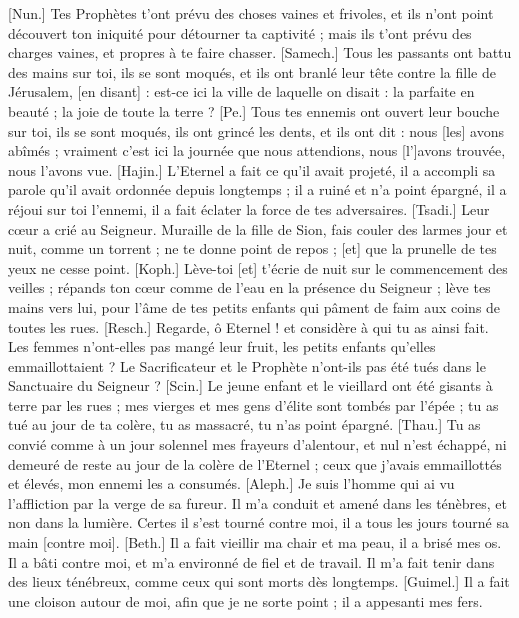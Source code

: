 \begin{multicols}{2}
[Nun.] Tes Prophètes t’ont prévu des choses vaines et frivoles, et ils n’ont point découvert ton iniquité pour détourner ta captivité ; mais ils t’ont prévu des charges vaines, et propres à te faire chasser.
[Samech.] Tous les passants ont battu des mains sur toi, ils se sont moqués, et ils ont branlé leur tête contre la fille de Jérusalem, [en disant] : est-ce ici la ville de laquelle on disait : la parfaite en beauté ; la joie de toute la terre ?
[Pe.] Tous tes ennemis ont ouvert leur bouche sur toi, ils se sont moqués, ils ont grincé les dents, et ils ont dit : nous [les] avons abîmés ; vraiment c’est ici la journée que nous attendions, nous [l’]avons trouvée, nous l’avons vue.
[Hajin.] L’Eternel a fait ce qu’il avait projeté, il a accompli sa parole qu’il avait ordonnée depuis longtemps ; il a ruiné et n’a point épargné, il a réjoui sur toi l'ennemi, il a fait éclater la force de tes adversaires.
[Tsadi.] Leur cœur a crié au Seigneur. Muraille de la fille de Sion, fais couler des larmes jour et nuit, comme un torrent ; ne te donne point de repos ; [et] que la prunelle de tes yeux ne cesse point.
[Koph.] Lève-toi [et] t’écrie de nuit sur le commencement des veilles ; répands ton cœur comme de l’eau en la présence du Seigneur ; lève tes mains vers lui, pour l’âme de tes petits enfants qui pâment de faim aux coins de toutes les rues.
[Resch.] Regarde, ô Eternel ! et considère à qui tu as ainsi fait. Les femmes n’ont-elles pas mangé leur fruit, les petits enfants qu’elles emmaillottaient ? Le Sacrificateur et le Prophète n’ont-ils pas été tués dans le Sanctuaire du Seigneur ?
[Scin.] Le jeune enfant et le vieillard ont été gisants à terre par les rues ; mes vierges et mes gens d’élite sont tombés par l’épée ; tu as tué au jour de ta colère, tu as massacré, tu n’as point épargné.
[Thau.] Tu as convié comme à un jour solennel mes frayeurs d’alentour, et nul n’est échappé, ni demeuré de reste au jour de la colère de l’Eternel ; ceux que j’avais emmaillottés et élevés, mon ennemi les a consumés.
\VerseOne{}[Aleph.] Je suis l’homme qui ai vu l’affliction par la verge de sa fureur.
Il m’a conduit et amené dans les ténèbres, et non dans la lumière.
Certes il s’est tourné contre moi, il a tous les jours tourné sa main [contre moi].
[Beth.] Il a fait vieillir ma chair et ma peau, il a brisé mes os.
Il a bâti contre moi, et m’a environné de fiel et de travail.
Il m’a fait tenir dans des lieux ténébreux, comme ceux qui sont morts dès longtemps.
[Guimel.] Il a fait une cloison autour de moi, afin que je ne sorte point ; il a appesanti mes fers.

\end{multicols}
